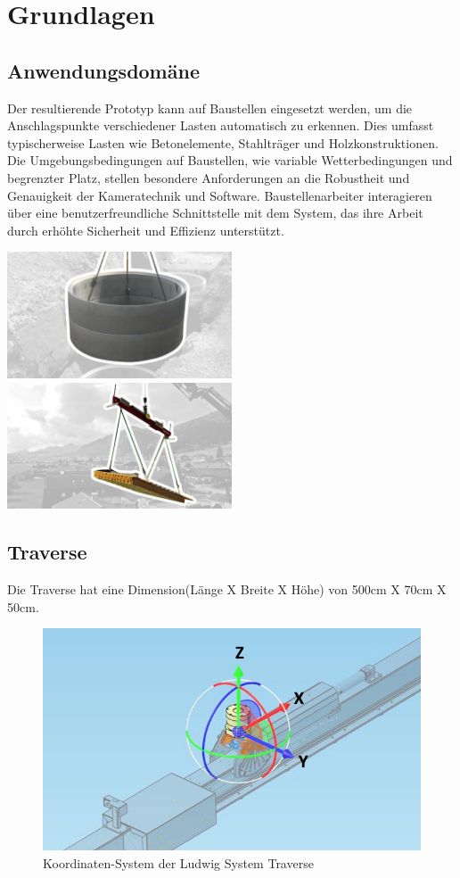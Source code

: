 \section{Grundlagen}


\subsection{Anwendungsdomäne}

Der resultierende Prototyp kann auf Baustellen eingesetzt werden, um die Anschlagspunkte verschiedener Lasten automatisch zu erkennen. Dies umfasst typischerweise Lasten wie Betonelemente, Stahlträger und Holzkonstruktionen. Die Umgebungsbedingungen auf Baustellen, wie variable Wetterbedingungen und begrenzter Platz, stellen besondere Anforderungen an die Robustheit und Genauigkeit der Kameratechnik und Software. Baustellenarbeiter interagieren über eine benutzerfreundliche Schnittstelle mit dem System, das ihre Arbeit durch erhöhte Sicherheit und Effizienz unterstützt.


\includegraphics[width=0.5\textwidth]{graphics/Betonelement.jpg}\hfill%
\includegraphics[width=0.5\textwidth]{graphics/Traverse.jpg}



\subsection{Traverse}
Die Traverse hat eine Dimension(Länge X Breite X Höhe) von 500cm X 70cm X 50cm.

\begin{figure}[h]
    \centering
    \includegraphics[width=0.5\linewidth]{graphics/Traverse_Rotationen.PNG}
    \caption{Koordinaten-System der Ludwig System Traverse}
    \label{fig:traverse}
\end{figure}


